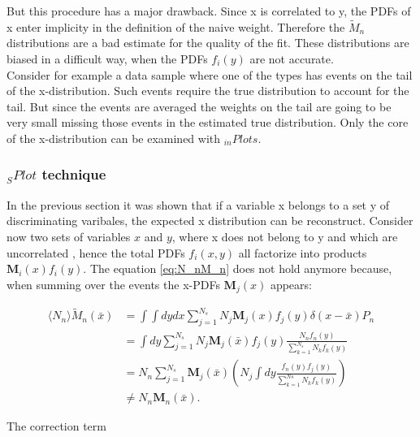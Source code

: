 \documentclass[english]{uzhpub}
\begin{document}
 But this procedure has a major drawback. Since x is correlated to y, the PDFs of x enter implicity in the definition of the naive weight. Therefore the $\tilde{M}_n$ distributions are a bad estimate for the quality of the fit. These distributions are biased in a difficult way, when the PDFs $f_i(y)$ are not accurate. \\
 Consider for example a data sample where one of the types has events on the tail of the x-distribution. Such events require the true distribution to account for the tail. But since the events are averaged the weights on the tail are going to be very small missing those events in the estimated true distribution.
 Only the core of the x-distribution can be examined with $_{in} Plots$.


 \subsubsection*{$_{S} Plot$ technique}
 In the previous section it was shown that if a variable x belongs to a set y of discriminating varibales, the expected x distribution can be reconstruct.
 Consider now two sets of variables $x$ and $y$, where x does not belong to y and which are uncorrelated , hence the total PDFs $f_i (x,y)$ all factorize into products $\textbf{M}_i (x) f_i(y)$.
 The equation \ref{eq:N_nM_n} does not hold anymore because, when summing over the events the x-PDFs $\textbf{M}_j(x)$ appears:

 \begin{align}
  \langle N_n \rangle \tilde{M}_n (\bar{x}) & = \int \int dy dx \sum_{j=1}^{N_s} N_j \textbf{M}_j (x) f_j (y) \delta (x- \bar{x}) P_n \label{eq:M_nX}                    \\
                                            & = \int dy \sum_{j=1}^{N_s} N_j \textbf{M}_j (\bar{x}) f_j(y) \frac{N_n f_n(y)}{\sum_{k=1}^{N_s} N_k f_k(y)}                \\
                                            & = N_n \sum_{j=1}^{N_s} \textbf{M}_j (\bar{x}) \left( N_j \int dy \frac{f_n(y) f_j(y)}{\sum_{k=1}^{Ns} N_k f_k (y)} \right) \\
                                            & \neq N_n \textbf{M}_n (\bar{x}).
 \end{align}

 The correction term
\end{document}
